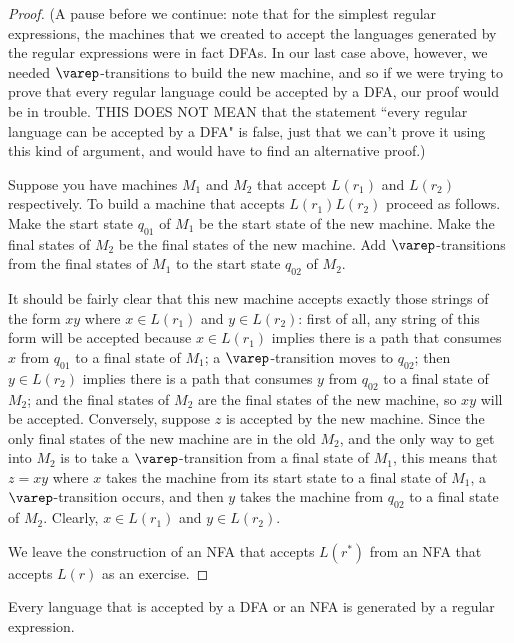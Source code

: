 \begin{proof}

(A pause before we continue: note that for the simplest regular expressions,
the machines that we created to accept the languages generated by the regular
expressions were in fact DFAs.  In our last case above, however, we needed
$\varep$-transitions to build the new machine, and so if we were trying to
prove that every regular language could be accepted by a DFA, our proof would
be in trouble.  THIS DOES NOT MEAN that the statement ``every regular language
can be accepted by a DFA" is false, just that we can't prove it using this kind
of argument, and would have to find an alternative proof.)

Suppose you have machines $M_1$ and $M_2$ that accept $L(r_1)$ and $L(r_2)$
respectively.  To build a machine that accepts $L(r_1)L(r_2)$ proceed as
follows.  Make the start state $q_{01}$ of $M_1$ be the start state of the new
machine.  Make the final states of $M_2$ be the final states of the new machine.
Add $\varep$-transitions from the final states of $M_1$ to the start state
$q_{02}$ of
$M_2$.


It should be fairly clear that this new machine accepts exactly those strings of
the form $xy$ where $x\in L(r_1)$ and $y \in L(r_2)$: first of all, any string
of this form will be accepted because $x\in L(r_1)$ implies there is a path that
consumes $x$ from
$q_{01}$ to a final state of $M_1$; a $\varep$-transition moves to $q_{02}$; 
then $y \in L(r_2)$ implies there is a path that consumes $y$ from $q_{02}$ to a
final state of $M_2$; and the final states of $M_2$ are the final states of the
new machine, so $xy$ will be accepted.  Conversely, suppose $z$ is accepted by
the new machine.  Since the only final states of the new machine are in the old
$M_2$, and the only way to get into $M_2$ is to take a $\varep$-transition from
a final state of $M_1$, this means that $z=xy$ where $x$ takes the machine from
its start state to a final state of $M_1$, a $\varep$-transition occurs, and
then $y$ takes the machine from $q_{02}$ to a final state of $M_2$.  Clearly,
$x\in L(r_1)$ and $y \in L(r_2)$. 

We leave the construction of an NFA that accepts $L(r^*)$ from an NFA that 
accepts $L(r)$ as an exercise.

\end{proof}

\smallskip

\begin{theorem}\label{T-DFAeqReg}
Every language that is accepted by a DFA or an NFA is generated by a regular 
expression.
\end{theorem}

